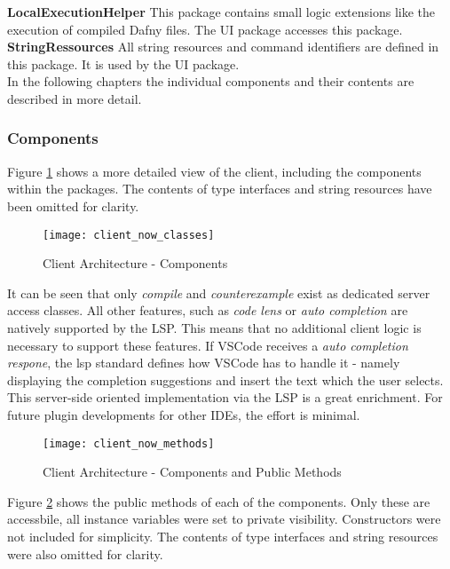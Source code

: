 {\bf LocalExecutionHelper} \textendash{}
This package contains small logic extensions like the execution of compiled Dafny files. The UI package accesses this package. \\

{\bf StringRessources} \textendash{}
All string resources and command identifiers are defined in this package. It is used by the UI package. \\

In the following chapters the individual components and their contents are described in more detail.

\subsubsection{Components}
Figure \ref{fig:client_now_classes} shows a more detailed view of the client, including the components within the packages. The contents of type interfaces and string resources have been omitted for clarity. \\

\begin{figure}[H]
    \centering
    \texttt{[image: client\_now\_classes]}
    \caption{Client Architecture - Components}
    \label{fig:client_now_classes}
\end{figure}

It can be seen that only \textit{compile} and \textit{counterexample} exist as dedicated server access classes. All other features, such as \textit{code lens} or \textit{auto completion} are natively supported by the LSP. This means that no additional client logic is necessary to support these features. If VSCode receives a \textit{auto completion respone}, the lsp standard defines how VSCode has to handle it - namely displaying the completion suggestions and insert the text which the user selects. This server-side oriented implementation via the LSP is a great enrichment. For future plugin developments for other IDEs, the effort is minimal.

\begin{figure}[H]
    \centering
    \texttt{[image: client\_now\_methods]}
    \caption{Client Architecture - Components and Public Methods}
    \label{fig:client_now_methods}
\end{figure}

Figure \ref{fig:client_now_methods} shows the public methods of each of the components. Only these are accessbile, all instance variables were set to private visibility. Constructors were not included for simplicity. The contents of type interfaces and string resources were also omitted for clarity.


